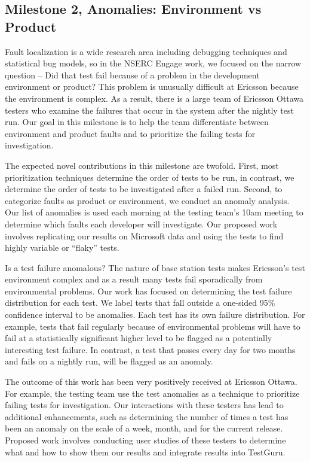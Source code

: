 \subsection{Milestone 2, Anomalies: Environment vs Product}

Fault localization is a wide research area including debugging techniques and statistical bug models, so in the NSERC Engage work, we focused on the narrow question -- Did that test fail because of a problem in the development environment or product? This problem is unusually difficult at Ericsson because the environment is complex. As a result, there is a large team of Ericsson Ottawa testers who examine the failures that occur in the system after the nightly test run. Our goal in this milestone is to help the team differentiate between environment and product faults and to prioritize the failing tests for investigation.

The expected novel contributions in this milestone are twofold. First, most prioritization techniques determine the order of tests to be run, in contrast, we determine the order of tests to be investigated after a failed run. Second, to categorize faults as product or environment, we conduct an anomaly analysis. Our list of anomalies is used each morning at the testing team's 10am meeting to determine which faults each developer will investigate. Our proposed work involves replicating our results on Microsoft data and using the tests to find highly variable or ``flaky'' tests. 

Is a test failure anomalous? The nature of base station tests makes Ericsson's test environment complex and as a result many tests fail sporadically from environmental problems. Our work has focused on determining the test failure distribution for each test. We label tests that fall outside a one-sided 95\% confidence interval to be anomalies. Each test has its own failure distribution. For example, tests that fail regularly because of environmental problems will have to fail at a statistically significant higher level to be flagged as a potentially interesting test failure. In contrast, a test that passes every day for two months and fails on a nightly run, will be flagged as an anomaly. 

The outcome of this work has been very positively received at Ericsson Ottawa. For example, the testing team use the test anomalies as a technique to prioritize failing tests for investigation. Our interactions with these testers has lead to additional enhancements, such as determining the number of times a test has been an anomaly on the scale of a week, month, and for the current release. Proposed work involves conducting user studies of these testers to determine what and how to show them our results and integrate results into TestGuru. 

